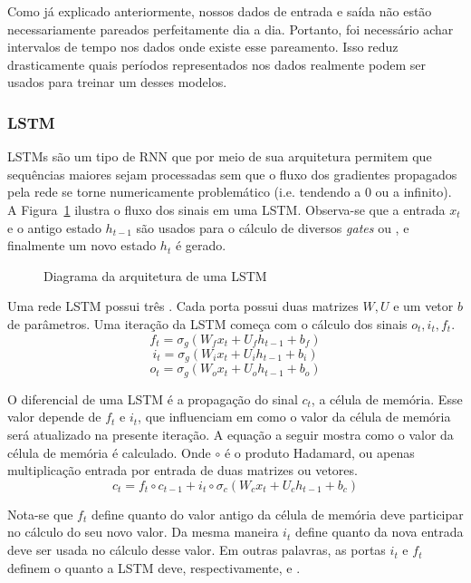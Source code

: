 Como já explicado anteriormente, nossos dados de entrada e saída não estão necessariamente pareados perfeitamente dia a dia. Portanto, foi necessário achar intervalos de tempo nos dados onde existe esse pareamento. Isso reduz drasticamente quais períodos representados nos dados realmente podem ser usados para treinar um desses modelos.


\subsubsection{LSTM}
\label{sec:lstm}

LSTMs \citep{lstm} são um tipo de RNN que por meio de sua arquitetura permitem que sequências
maiores sejam processadas sem que o fluxo dos gradientes propagados pela rede se torne
numericamente problemático (i.e. tendendo a 0 ou a infinito). A
Figura~\ref{fig:lstm} ilustra o fluxo dos sinais em uma LSTM. Observa-se que a
entrada $x_t$ e o antigo estado $h_{t-1}$ são usados para o cálculo de diversos \textit{gates} ou , e
finalmente um novo estado $h_t$ é gerado.\\

\begin{figure}
\centering
\caption{Diagrama da arquitetura de uma LSTM}

\label{fig:lstm}
\end{figure}




Uma rede LSTM possui três . Cada porta possui duas matrizes $W,U$ e um
vetor $b$ de parâmetros. Uma iteração da LSTM começa com o cálculo dos sinais
$o_t,i_t,f_t$.\\

\[f_t = \sigma_g(W_fx_t + U_fh_{t-1} + b_f)\]
\[i_t = \sigma_g(W_ix_t + U_ih_{t-1} + b_i)\]
\[o_t = \sigma_g(W_ox_t + U_oh_{t-1} + b_o)\]

O diferencial de uma LSTM é a propagação do sinal $c_t$, a célula de memória.
Esse valor depende de $f_t$ e $i_t$, que influenciam em como o valor da
célula de memória será atualizado na presente iteração. A equação a seguir
mostra como o valor da célula de memória é calculado. Onde $\circ$ é o produto Hadamard, ou apenas multiplicação entrada por entrada de
duas matrizes ou vetores. \\

\[c_t = f_t \circ c_{t-1} + i_t \circ \sigma_c(W_cx_t + U_ch_{t-1} + b_c)\]

Nota-se que $f_t$
define quanto do valor antigo da célula de memória deve participar no cálculo do
seu novo valor. 
Da mesma maneira $i_t$ define quanto da nova entrada deve ser usada no cálculo desse valor.
Em outras palavras, as portas $i_t$ e $f_t$ definem o quanto a LSTM deve,
respectivamente,  e .


